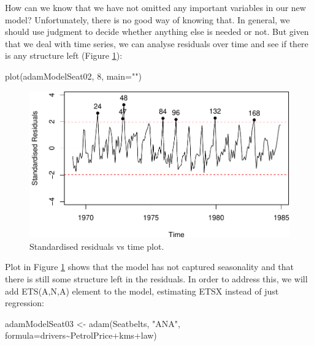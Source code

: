 \documentclass[
]{book}
\newenvironment{Shaded}{\begin{snugshade}}{\end{snugshade}}
\newcommand{\AttributeTok}[1]{\textcolor[rgb]{0.77,0.63,0.00}{#1}}
\newcommand{\DecValTok}[1]{\textcolor[rgb]{0.00,0.00,0.81}{#1}}
\newcommand{\FunctionTok}[1]{\textcolor[rgb]{0.00,0.00,0.00}{#1}}
\newcommand{\NormalTok}[1]{#1}
\newcommand{\OtherTok}[1]{\textcolor[rgb]{0.56,0.35,0.01}{#1}}
\newcommand{\SpecialCharTok}[1]{\textcolor[rgb]{0.00,0.00,0.00}{#1}}
\newcommand{\StringTok}[1]{\textcolor[rgb]{0.31,0.60,0.02}{#1}}
\theoremstyle{definition}
\theoremstyle{definition}
\theoremstyle{definition}
\theoremstyle{definition}
\theoremstyle{remark}
\begin{document}
How can we know that we have not omitted any important variables in our new model? Unfortunately, there is no good way of knowing that. In general, we should use judgment to decide whether anything else is needed or not. But given that we deal with time series, we can analyse residuals over time and see if there is any structure left (Figure \ref{fig:adamModelSeat02Resid}):

\begin{Shaded}
\begin{Highlighting}[]
\FunctionTok{plot}\NormalTok{(adamModelSeat02, }\DecValTok{8}\NormalTok{, }\AttributeTok{main=}\StringTok{""}\NormalTok{)}
\end{Highlighting}
\end{Shaded}

\begin{figure}
\centering
\includegraphics{Svetunkov--2022----ADAM_files/figure-latex/adamModelSeat02Resid-1.pdf}
\caption{\label{fig:adamModelSeat02Resid}Standardised residuals vs time plot.}
\end{figure}

Plot in Figure \ref{fig:adamModelSeat02Resid} shows that the model has not captured seasonality and that there is still some structure left in the residuals. In order to address this, we will add ETS(A,N,A) element to the model, estimating ETSX instead of just regression:

\begin{Shaded}
\begin{Highlighting}[]
\NormalTok{adamModelSeat03 }\OtherTok{\textless{}{-}} \FunctionTok{adam}\NormalTok{(Seatbelts, }\StringTok{"ANA"}\NormalTok{,}
                        \AttributeTok{formula=}\NormalTok{drivers}\SpecialCharTok{\textasciitilde{}}\NormalTok{PetrolPrice}\SpecialCharTok{+}\NormalTok{kms}\SpecialCharTok{+}\NormalTok{law)}
\end{Highlighting}
\end{Shaded}
\end{document}
